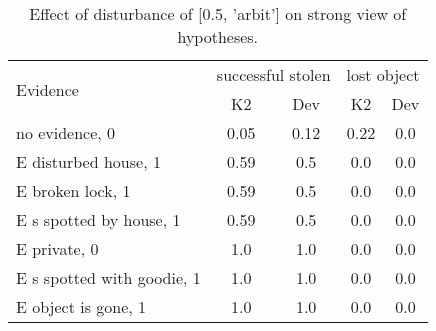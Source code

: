 \begin{table}\begin{tabular}{l|cc|cc}\toprule\multirow{2}{*}{Evidence} & \multicolumn{2}{c}{successful stolen}& \multicolumn{2}{c}{lost object}\\& {K2} & {Dev}& {K2} & {Dev}\\\midrule
no evidence, 0 & \cellcolor{Bittersweet}0.05&\cellcolor{Bittersweet}0.12&\cellcolor{Bittersweet}0.22&\cellcolor{Bittersweet}0.0\\E disturbed house, 1 & \cellcolor{Bittersweet}0.59&\cellcolor{Bittersweet}0.5&0.0&0.0\\E broken lock, 1 & \cellcolor{Bittersweet}0.59&\cellcolor{Bittersweet}0.5&0.0&0.0\\E s spotted by house, 1 & \cellcolor{Bittersweet}0.59&\cellcolor{Bittersweet}0.5&0.0&0.0\\E private, 0 & 1.0&1.0&0.0&0.0\\E s spotted with goodie, 1 & 1.0&1.0&0.0&0.0\\E object is gone, 1 & 1.0&1.0&0.0&0.0\\\bottomrule\end{tabular}\caption{Effect of disturbance of [0.5, 'arbit'] on strong view of hypotheses.}\end{table}